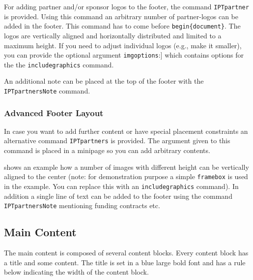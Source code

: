 For adding partner and/or sponsor logos to the footer, the command \texttt{\bs{}IPTpartner} is provided. Using this command an arbitrary number of partner-logos can be added in the footer. This command has to come before \texttt{\bs{}begin\{document\}}. The logos are vertically aligned and horizontally distributed and limited to a maximum height. If you need to adjust individual logos (e.g., make it smaller), you can provide the optional argument \texttt{imgoptions}:] which contains options for the the \texttt{\bs{}includegraphics} command.

An additional note can be placed at the top of the footer with the \texttt{\bs{}IPTpartnersNote} command.



\subsubsection{Advanced Footer Layout}

In case you want to add further content or have special placement constraints an alternative command \texttt{\bs{}IPTpartners} is provided. The argument given to this command is placed in a minipage so you can add arbitrary contents. 

 shows an example how a number of images with different height can be vertically aligned to the center (note: for demonstration purpose a simple \texttt{\bs{}framebox} is used in the example. You can replace this with an \texttt{\bs{}includegraphics} command).
In addition a single line of text can be added to the footer using the command \texttt{\bs{}IPTpartnersNote} mentioning funding contracts etc.




\subsection{Main Content} %

The main content is composed of several content blocks. Every content block has a title and some content. The title is set in a blue large bold font and has a rule below indicating the width of the content block.

